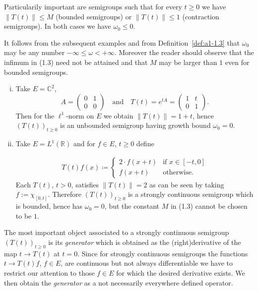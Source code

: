 Particularily important are semigroups such that for every $t \geq 0$ we have $\|T(t)\| \leq M$ (bounded semigroups) or $\|T(t)\| \leq 1$ (contraction semigroups).
In both cases we have $\omega_{0} \leq 0$.

It follows from the subsequent examples and from Definition~\ref{def:a1-1.3} that $\omega_{0}$ may be any number $ -\infty \leq \omega < +\infty$.
Moreover the reader should observe that the infimum in (1.3) need not be attained and that $M$ may be larger than $1$ even for bounded semigroups.

\begin{examples}\label{ex:a1-1.4}
\begin{enumerate}[(i), wide]
\item 
Take $E = \mathbb{C}^2$, 
\[
	A = \begin{pmatrix}0 & 1\\0 & 0\end{pmatrix} 
	\quad \text{and} \quad 
	T(t) = e^{tA} = \begin{pmatrix}1 & t\\0 & 1\end{pmatrix} .
\]
%
Then for the $\ell^{1}$-norm on $E$ we obtain $\|T(t)\| = 1 + t$, hence $(T(t))_{t\geq0}$ is an unbounded semigroup having growth bound $\omega_{0} = 0$.

\item 
Take $E = L^1(\mathbb{R})$ and for $f \in E$, $t \geq 0$ define

\begin{align*}
T(t)f(x) \coloneqq 
	\begin{cases}
		2\cdot f(x+t) & \text{if } x \in [-t,0] \\
		f(x+t) & \text{otherwise}.
	\end{cases}
\end{align*}
Each $T(t)$, $t > 0$, satisfies $\|T(t)\| = 2$ as can be seen by taking $f := \chi_{[0,t]}$.
Therefore $(T(t))_{t \geq 0}$ is a strongly continuous semigroup which is bounded, hence has $\omega_{0} = 0$, but the constant $M$ in (1.3) cannot be chosen to be $1$.

\end{enumerate}
\end{examples}
The most important object associated to a strongly continuous semigroup $(T(t))_{t\geq0}$ is its \emph{generator} which is obtained as the (right)derivative of the map $t \to T(t)$ at $t = 0$.
Since for strongly continuous semigroups the functions $t \to T(t)f$, $f \in E$, are continuous but not always differentiable we have to restrict our attention to those $f \in E$ for which the desired derivative exists.
We then obtain the \emph{generator} as a not necessarily everywhere defined operator.

